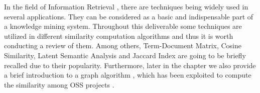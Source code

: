 




In the field of Information Retrieval \cite{Manning:2008:IIR:1394399}, there are techniques being widely used in several applications. They can be considered as a basic and indispensable part of a knowledge mining system. Throughout this deliverable some techniques are utilized in different similarity computation algorithms and thus it is worth conducting a review of them. Among others, Term-Document Matrix, Cosine Similarity, Latent Semantic Analysis and Jaccard Index are going to be briefly recalled due to their popularity. Furthermore, later in the chapter we also provide a brief introduction to a graph algorithm \cite{Jeh:2002:SMS:775047.775126}, which has been exploited to compute the similarity among OSS projects \cite{NDRDSEAA2018}.






